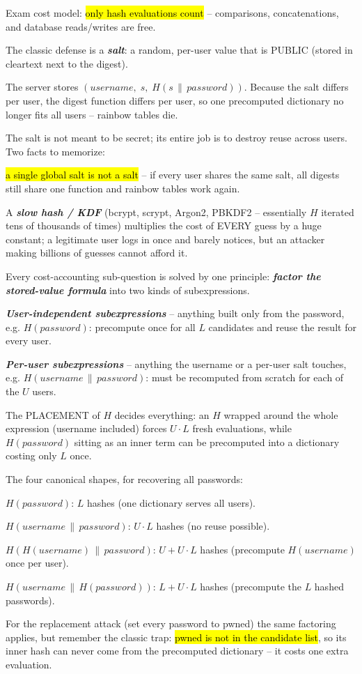 \documentclass[12pt, a4paper]{article}
\newcommand{\term}[1]{\textbf{\textit{#1}}}        %
\newcommand{\imp}[1]{\hl{#1}}                       %
\begin{document}
Exam cost model: \imp{only hash evaluations count} -- comparisons, concatenations, and database reads/writes are free.

The classic defense is a \term{salt}: a random, per-user value that is PUBLIC (stored in cleartext next to the digest).

The server stores $(username,\; s,\; H(s \,\|\, password))$. Because the salt differs per user, the digest function differs per user, so one precomputed dictionary no longer fits all users -- rainbow tables die.

The salt is not meant to be secret; its entire job is to destroy reuse across users. Two facts to memorize:
\begin{tightitem}
    \item \imp{a single global salt is not a salt} -- if every user shares the same salt, all digests still share one function and rainbow tables work again.
    \item A \term{slow hash / KDF} (bcrypt, scrypt, Argon2, PBKDF2 -- essentially $H$ iterated tens of thousands of times) multiplies the cost of EVERY guess by a huge constant; a legitimate user logs in once and barely notices, but an attacker making billions of guesses cannot afford it.
\end{tightitem}

Every cost-accounting sub-question is solved by one principle: \term{factor the stored-value formula} into two kinds of subexpressions.
\begin{tightitem}
    \item \term{User-independent subexpressions} -- anything built only from the password, e.g. $H(password)$: precompute once for all $L$ candidates and reuse the result for every user.
    \item \term{Per-user subexpressions} -- anything the username or a per-user salt touches, e.g. $H(username \,\|\, password)$: must be recomputed from scratch for each of the $U$ users.
\end{tightitem}
The PLACEMENT of $H$ decides everything: an $H$ wrapped around the whole expression (username included) forces $U \cdot L$ fresh evaluations, while $H(password)$ sitting as an inner term can be precomputed into a dictionary costing only $L$ once.

The four canonical shapes, for recovering all passwords:\begin{tightitem}\item $H(password)$: $L$ hashes (one dictionary serves all users).\item $H(username \,\|\, password)$: $U \cdot L$ hashes (no reuse possible).\item $H(H(username) \,\|\, password)$: $U + U \cdot L$ hashes (precompute $H(username)$ once per user).\item $H(username \,\|\, H(password))$: $L + U \cdot L$ hashes (precompute the $L$ hashed passwords).\end{tightitem}For the replacement attack (set every password to pwned) the same factoring applies, but remember the classic trap: \imp{pwned is not in the candidate list}, so its inner hash can never come from the precomputed dictionary -- it costs one extra evaluation.
\end{document}
